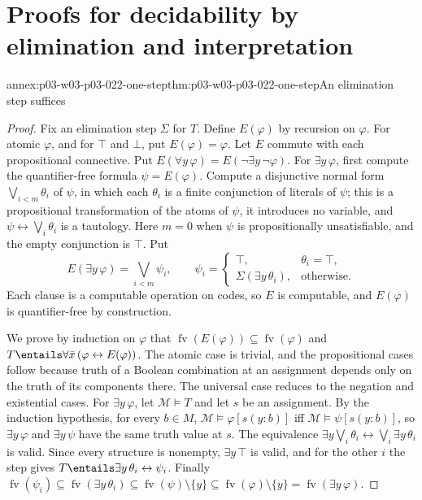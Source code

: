 \section{Proofs for decidability by elimination and interpretation}
\label{sec:annex-p03-w03-p03-022-decidability}

\begin{annexitem}{annex:p03-w03-p03-022-one-step}{thm:p03-w03-p03-022-one-step}{An elimination step suffices}
\begin{proof}
Fix an elimination step \(\Sigma\) for \(T\). Define \(E(\varphi)\) by
recursion on \(\varphi\). For atomic \(\varphi\), and for \(\top\) and
\(\bot\), put \(E(\varphi)=\varphi\). Let \(E\) commute with each
propositional connective. Put \(E(\forall y\,\varphi)=E(\neg\exists y\,\neg\varphi)\).
For \(\exists y\,\varphi\), first compute the quantifier-free formula
\(\psi=E(\varphi)\). Compute a disjunctive normal form
\(\bigvee_{i<m}\theta_i\) of \(\psi\), in which each \(\theta_i\) is a
finite conjunction of literals of \(\psi\); this is a propositional
transformation of the atoms of \(\psi\), it introduces no variable, and
\(\psi\leftrightarrow\bigvee_i\theta_i\) is a tautology. Here \(m=0\) when
\(\psi\) is propositionally unsatisfiable, and the empty conjunction is
\(\top\). Put
\[
  E(\exists y\,\varphi)=\bigvee_{i<m}\psi_i,\qquad
  \psi_i=\begin{cases}\top,&\theta_i=\top,\\
  \Sigma(\exists y\,\theta_i),&\text{otherwise.}\end{cases}
\]
Each clause is a computable operation on codes, so \(E\) is computable,
and \(E(\varphi)\) is quantifier-free by construction.

We prove by induction on \(\varphi\) that
\(\operatorname{fv}(E(\varphi))\subseteq\operatorname{fv}(\varphi)\) and
\(T\entails\forall\bar x\,(\varphi\leftrightarrow E(\varphi))\). The atomic
case is trivial, and the propositional cases follow because truth of a
Boolean combination at an assignment depends only on the truth of its
components there. The universal case reduces to the negation and
existential cases. For \(\exists y\,\varphi\), let \(\mathcal M\models T\) and
let \(s\) be an assignment. By the induction hypothesis, for every
\(b\in M\), \(\mathcal M\models\varphi[s(y{:}b)]\) iff
\(\mathcal M\models\psi[s(y{:}b)]\), so \(\exists y\,\varphi\) and
\(\exists y\,\psi\) have the same truth value at \(s\). The equivalence
\(\exists y\bigvee_i\theta_i\leftrightarrow\bigvee_i\exists y\,\theta_i\) is
valid. Since every structure is nonempty, \(\exists y\,\top\) is valid, and
for the other \(i\) the step gives
\(T\entails\exists y\,\theta_i\leftrightarrow\psi_i\). Finally
\(\operatorname{fv}(\psi_i)\subseteq\operatorname{fv}(\exists y\,\theta_i)
\subseteq\operatorname{fv}(\psi)\setminus\{y\}
\subseteq\operatorname{fv}(\varphi)\setminus\{y\}
=\operatorname{fv}(\exists y\,\varphi)\).
\end{proof}
\end{annexitem}

